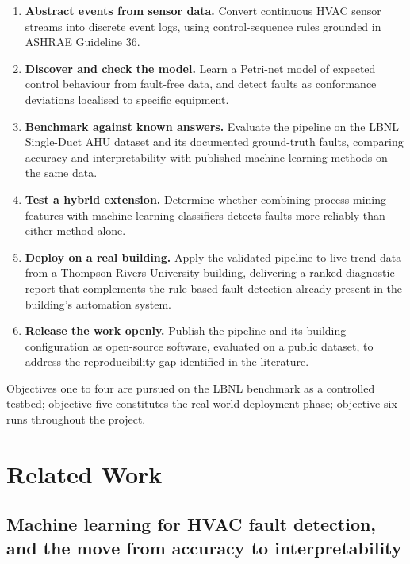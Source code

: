 \documentclass[11pt,letterpaper]{article}
\begin{document}
\begin{enumerate}
\item \textbf{Abstract events from sensor data.} Convert continuous HVAC sensor streams into discrete event logs, using control-sequence rules grounded in ASHRAE Guideline 36.
\item \textbf{Discover and check the model.} Learn a Petri-net model of expected control behaviour from fault-free data, and detect faults as conformance deviations localised to specific equipment.
\item \textbf{Benchmark against known answers.} Evaluate the pipeline on the LBNL Single-Duct AHU dataset and its documented ground-truth faults, comparing accuracy and interpretability with published machine-learning methods on the same data.
\item \textbf{Test a hybrid extension.} Determine whether combining process-mining features with machine-learning classifiers detects faults more reliably than either method alone.
\item \textbf{Deploy on a real building.} Apply the validated pipeline to live trend data from a Thompson Rivers University building, delivering a ranked diagnostic report that complements the rule-based fault detection already present in the building's automation system.
\item \textbf{Release the work openly.} Publish the pipeline and its building configuration as open-source software, evaluated on a public dataset, to address the reproducibility gap identified in the literature.
\end{enumerate}

\noindent Objectives one to four are pursued on the LBNL benchmark as a controlled testbed; objective five constitutes the real-world deployment phase; objective six runs throughout the project.

\section{Related Work}
\label{sec:related}

\subsection{Machine learning for HVAC fault detection, and the move from accuracy to interpretability}
\end{document}
